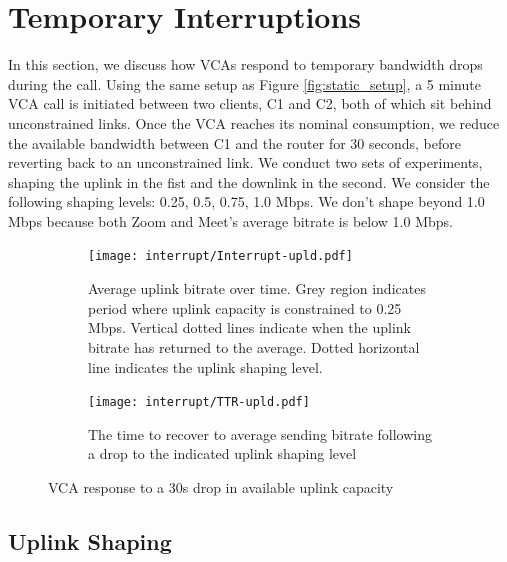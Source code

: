 

\section{Temporary Interruptions}
\label{sec:interruption}
In this section, we discuss how VCAs respond to temporary bandwidth drops during the call. Using the same setup as Figure \ref{fig:static_setup}, a 5 minute VCA call is initiated between two clients, C1 and C2, both of which sit behind unconstrained links. Once the VCA reaches its nominal consumption, we reduce the available bandwidth between C1 and the router for 30 seconds, before reverting back to an unconstrained link. We conduct two sets of experiments, shaping the uplink in the fist and the downlink in the second. We consider the following shaping levels: {0.25, 0.5, 0.75, 1.0} Mbps. We don't shape beyond 1.0 Mbps because both Zoom and Meet's average bitrate is below 1.0 Mbps.

\begin{figure}[t!]
\centering
\begin{subfigure}[t]{.45\textwidth}
    \centering
    \texttt{[image: interrupt/Interrupt-upld.pdf]}
    \caption{Average uplink bitrate over time. Grey region indicates period where uplink capacity is constrained to 0.25 Mbps. Vertical dotted lines indicate when the uplink bitrate has returned to the average. Dotted horizontal line indicates the uplink shaping level.}
    \label{fig:ts_upld}
\end{subfigure}\hfill
\begin{subfigure}[t]{.45\textwidth}
      \centering
    \texttt{[image: interrupt/TTR-upld.pdf]}
    \caption{The time to recover to average sending bitrate following a drop to the indicated uplink shaping level}
    \label{fig:TTR_upld}
\end{subfigure}
\caption{VCA response to a 30s drop in available uplink capacity}
\label{fig:interrupt-upld}
\end{figure}

\subsection{Uplink Shaping}



